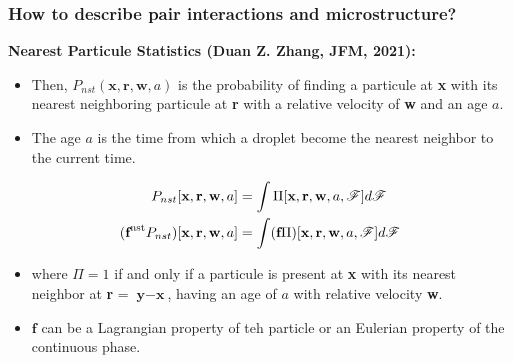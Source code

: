 \documentclass{sintefbeamer}
\begin{document}
\begin{frame}
  \frametitle{How to describe pair interactions and microstructure?}
  
  \textbf{Nearest Particule Statistics (Duan Z. Zhang, JFM, 2021): }
  \begin{definition}
    \begin{itemize}
      \item Then, $P_{nst}(\textbf{x},\textbf{r},\textbf{w},a) $ is the probability of finding a particule at \textbf{x} with its nearest neighboring particule at \textbf{r} with a relative velocity of \textbf{w} and an age $a$. 
      \item The age $a$ is the time from which a droplet become the nearest neighbor to the current time. 
    \end{itemize}
  \end{definition}

  \begin{align*}
    P_{nst}[\textbf{x},\textbf{r},\textbf{w},a]
    &= \int \Pi[\textbf{x},\textbf{r},\textbf{w},a,\mathscr{F}] d\mathscr{F}\\
    (\textbf{f}^\text{nst}P_{nst})[\textbf{x},\textbf{r},\textbf{w},a]
    &= \int (\textbf{f} \Pi)[\textbf{x},\textbf{r},\textbf{w},a,\mathscr{F}] d\mathscr{F}
  \end{align*}
  \begin{itemize}
    \item 
    where $\Pi = 1$ if and only if a particule is present at \textbf{x} with its nearest neighbor at \textbf{r} = $\textbf{y}-\textbf{x}$, having an age of $a$ with relative velocity \textbf{w}. 
    \item $\textbf{f}$ can be a Lagrangian property of teh particle or an Eulerian property of the continuous phase. 
  \end{itemize}
\end{frame}
\end{document}
